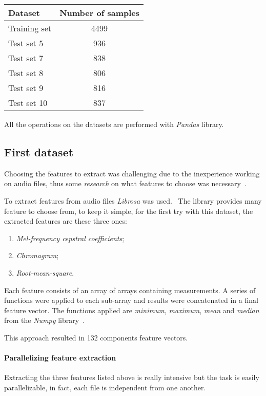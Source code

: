 \begin{center}
    \begin{tabular}{ |l|c| } 
        \hline
        Dataset & Number of samples \\
        \hline
        Training set & 4499 \\
        Test set 5 & 936 \\
        Test set 7 & 838 \\
        Test set 8 & 806 \\
        Test set 9 & 816 \\
        Test set 10 & 837 \\
        \hline
    \end{tabular}
\end{center}

All the operations on the datasets are performed with \emph{Pandas} library.~\cite{pandas}

\subsection{First dataset}
Choosing the features to extract was challenging due to the inexperience working on audio files, thus some \emph{research} on what features to 
choose was necessary~\cite{features}.

To extract features from audio files \emph{Librosa} was used.~\cite{librosa}
The library provides many feature to choose from,
to keep it simple, for the first try with this dataset, the extracted features 
are these three ones: 
\begin{enumerate}
    \item \emph{Mel-frequency cepstral coefficients};
    \item \emph{Chromagram};
    \item \emph{Root-mean-square}.
\end{enumerate}
Each feature consists of an array of arrays containing measurements. 
A series of functions were applied to each sub-array and results 
were concatenated in a final feature vector. 
The functions applied are \emph{minimum}, \emph{maximum}, \emph{mean} 
and \emph{median} from the \emph{Numpy} library~\cite{numpy}.

This approach resulted in 132 components feature vectors.

\paragraph{Parallelizing feature extraction}
Extracting the three features listed above is really intensive 
but the task is easily parallelizable, in fact, each file is independent 
from one another.

